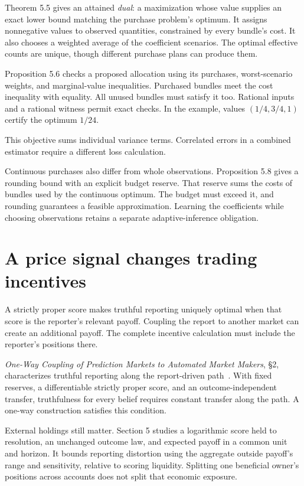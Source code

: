 \documentclass{momentum}
\begin{document}
Theorem 5.5 gives an attained \emph{dual}: a maximization whose value supplies an exact lower bound matching the purchase problem's optimum. It assigns nonnegative values to observed quantities, constrained by every bundle's cost. It also chooses a weighted average of the coefficient scenarios. The optimal effective counts are unique, though different purchase plans can produce them.

Proposition 5.6 checks a proposed allocation using its purchases, worst-scenario weights, and marginal-value inequalities. Purchased bundles meet the cost inequality with equality. All unused bundles must satisfy it too. Rational inputs and a rational witness permit exact checks. In the example, values $(1/4,3/4,1)$ certify the optimum $1/24$.

This objective sums individual variance terms. Correlated errors in a combined estimator require a different loss calculation.

Continuous purchases also differ from whole observations. Proposition 5.8 gives a rounding bound with an explicit budget reserve. That reserve sums the costs of bundles used by the continuous optimum. The budget must exceed it, and rounding guarantees a feasible approximation. Learning the coefficients while choosing observations retains a separate adaptive-inference obligation.

\section{A price signal changes trading incentives}

A strictly proper score makes truthful reporting uniquely optimal when that score is the reporter's relevant payoff. Coupling the report to another market can create an additional payoff. The complete incentive calculation must include the reporter's positions there.

\emph{One-Way Coupling of Prediction Markets to Automated Market Makers}, \S2, characterizes truthful reporting along the report-driven path~\cite{coupling}. With fixed reserves, a differentiable strictly proper score, and an outcome-independent transfer, truthfulness for every belief requires constant transfer along the path. A one-way construction satisfies this condition.

External holdings still matter. Section 5 studies a logarithmic score held to resolution, an unchanged outcome law, and expected payoff in a common unit and horizon. It bounds reporting distortion using the aggregate outside payoff's range and sensitivity, relative to scoring liquidity. Splitting one beneficial owner's positions across accounts does not split that economic exposure.
\end{document}
